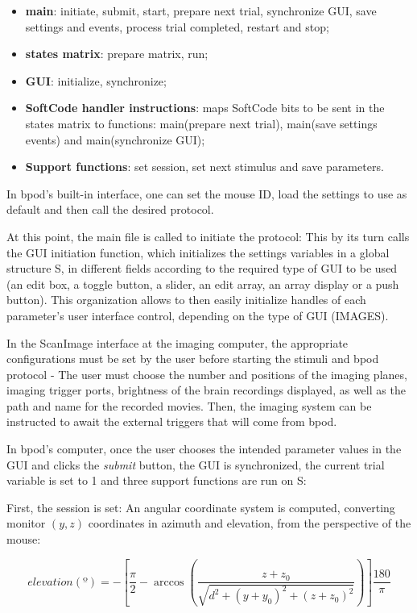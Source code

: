 \begin{itemize}
\item \textbf{main}: initiate, submit, start, prepare next trial, synchronize GUI, save settings and events, process trial completed, restart and stop;
\item \textbf{states matrix}: prepare matrix, run;
\item \textbf{GUI}: initialize, synchronize;
\item \textbf{SoftCode handler instructions}: maps SoftCode bits to be sent in the states matrix to functions: main(prepare next trial), main(save settings events) and main(synchronize GUI);
\item \textbf{Support functions}: set session, set next stimulus and save parameters.
\end{itemize}

In bpod's built-in interface, one can set the mouse ID, load the settings to use as default and then call the desired protocol. 

At this point, the main file is called to initiate the protocol: This by its turn calls the GUI initiation function, which initializes the settings variables in a global structure S, in different fields according to the required type of GUI to be used (an edit box, a toggle button, a slider, an edit array, an array display or a push button). This organization allows to then easily initialize handles of each parameter's user interface control, depending on the type of GUI (IMAGES).

In the ScanImage interface at the imaging computer, the appropriate configurations must be set by the user before starting the stimuli and bpod protocol - The user must choose the number and positions of the imaging planes, imaging trigger ports, brightness of the brain recordings displayed, as well as the path and name for the recorded movies. Then, the imaging system can be instructed to await the external triggers that will come from bpod.

In bpod's computer, once the user chooses the intended parameter values in the GUI and clicks the \textit{submit} button, the GUI is synchronized, the current trial variable is set to 1 and three support functions are run on S: 

First, the session is set: An angular coordinate system is computed, converting monitor $(y,z)$ coordinates in azimuth and elevation, from the perspective of the mouse:

\begin{equation}
elevation(º)= - \left[ \dfrac{\pi}{2} - \arccos \left( \dfrac{z+z_0}{\sqrt{d^2 + (y + y_0)^2 + (z+z_0)^2}} \right) \right] \dfrac{180}{\pi}
\end{equation}

